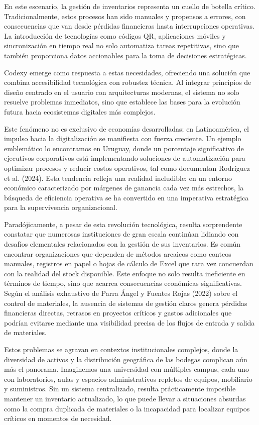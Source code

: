 En este escenario, la gestión de inventarios representa un cuello de botella crítico. Tradicionalmente, estos procesos han sido manuales y propensos a errores, con consecuencias que van desde pérdidas financieras hasta interrupciones operativas. La introducción de tecnologías como códigos QR, aplicaciones móviles y sincronización en tiempo real no solo automatiza tareas repetitivas, sino que también proporciona datos accionables para la toma de decisiones estratégicas.

Codexy emerge como respuesta a estas necesidades, ofreciendo una solución que combina accesibilidad tecnológica con robustez técnica. Al integrar principios de diseño centrado en el usuario con arquitecturas modernas, el sistema no solo resuelve problemas inmediatos, sino que establece las bases para la evolución futura hacia ecosistemas digitales más complejos.

Este fenómeno no es exclusivo de economías desarrolladas; en Latinoamérica, el impulso hacia la digitalización se manifiesta con fuerza creciente. Un ejemplo emblemático lo encontramos en Uruguay, donde un porcentaje significativo de ejecutivos corporativos está implementando soluciones de automatización para optimizar procesos y reducir costos operativos, tal como documentan Rodríguez et al. (2024). Esta tendencia refleja una realidad ineludible: en un entorno económico caracterizado por márgenes de ganancia cada vez más estrechos, la búsqueda de eficiencia operativa se ha convertido en una imperativa estratégica para la supervivencia organizacional.

Paradójicamente, a pesar de esta revolución tecnológica, resulta sorprendente constatar que numerosas instituciones de gran escala continúan lidiando con desafíos elementales relacionados con la gestión de sus inventarios. Es común encontrar organizaciones que dependen de métodos arcaicos como conteos manuales, registros en papel o hojas de cálculo de Excel que rara vez concuerdan con la realidad del stock disponible. Este enfoque no solo resulta ineficiente en términos de tiempo, sino que acarrea consecuencias económicas significativas. Según el análisis exhaustivo de Parra Ángel y Fuentes Rojas (2022) sobre el control de materiales, la ausencia de sistemas de gestión claros genera pérdidas financieras directas, retrasos en proyectos críticos y gastos adicionales que podrían evitarse mediante una visibilidad precisa de los flujos de entrada y salida de materiales.

Estos problemas se agravan en contextos institucionales complejos, donde la diversidad de activos y la distribución geográfica de las bodegas complican aún más el panorama. Imaginemos una universidad con múltiples campus, cada uno con laboratorios, aulas y espacios administrativos repletos de equipos, mobiliario y suministros. Sin un sistema centralizado, resulta prácticamente imposible mantener un inventario actualizado, lo que puede llevar a situaciones absurdas como la compra duplicada de materiales o la incapacidad para localizar equipos críticos en momentos de necesidad.

